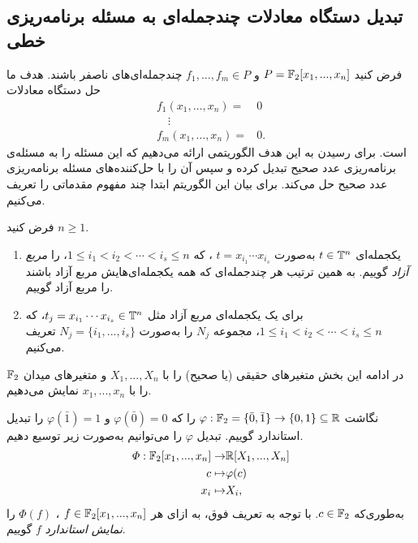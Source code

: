 \subsection{تبدیل دستگاه معادلات چندجمله‌ای به مسئله برنامه‌ریزی خطی}
فرض کنید 
$P = \mathbb{F}_{2}[x_{1},...,x_{n}]$
و 
$f_{1},...,f_{m}\in P$
چندجمله‌ای‌های ناصفر باشند.  هدف ما حل دستگاه معادلات 
\begin{align*}
f_{1}(x_{1}, \ldots, x_{n}) =& 0\\
\quad \vdots& \\
f_{m}(x_{1}, \ldots, x_{n}) =& 0. 
\end{align*}
است. برای رسیدن به این هدف الگوریتمی ارائه می‌دهیم که این مسئله را به مسئله‌ی برنامه‌ریزی عدد صحیح تبدیل کرده و سپس آن را با حل‌کننده‌های  مسئله‌  برنامه‌ریزی عدد صحیح حل می‌کند.  برای بیان این الگوریتم ابتدا چند مفهوم مقدماتی را تعریف می‌کنیم. 
\begin{definition}
فرض کنید
$n \geq 1$.
\begin{enumerate}
\item 
یکجمله‌ای‌ 
$t\in {\mathbb{T}}^{n}$
به‌صورت 
$t = x_{i_{1}}\cdots x_{i_{s}}$
،  که 
$1\leq i_{1}< i_{2} < \cdots < i_{s} \leq n$،
را 
\textit{مربع آزاد}
گوییم. به همین ترتیب هر چندجمله‌ای که همه‌  یکجمله‌ای‌هایش مربع آزاد باشند را مربع آزاد گوییم. 
\item
برای یک یکجمله‌ای مربع آزاد مثل 
$t_{j} = x_{i_{1}}\cdots x_{i_{s}}\in {\mathbb{T}}^{n}$، 
که 
$1\leq i_{1} < i_{2} <\cdots < i_{s}\leq n$، 
مجموعه‌ 
$N_{j}$
را به‌صورت 
$N_{j} = \{i_{1},...,i_{s}\}$
تعریف می‌کنیم.
\end{enumerate}
\end{definition}
 در ادامه  این بخش متغیرهای حقیقی (یا صحیح) را با 
 $X_{1},...,X_{n}$
 و متغیرهای میدان 
 $\mathbb{F}_{2}$
 را با 
 $x_{1},...,x_{n}$
نمایش می‌دهیم. 
\begin{definition}
نگاشت 
$\varphi :\mathbb{F}_{2} = \{\bar{0},\bar{1}\}\rightarrow \{0, 1\}\subseteq \mathbb{R}$
را که 
$\varphi(\bar{0}) = 0$
و
$\varphi(\bar{1}) = 1$
را تبدیل استاندارد گوییم. تبدیل 
$\varphi$
را می‌توانیم به‌صورت زیر  توسیع دهیم. 
\begin{align*}
\varPhi:\mathbb{F}_{2}[x_{1},...,x_{n}]\rightarrow& \mathbb{R}[X_{1},...,X_{n}]\\
c\mapsto& \varphi(c)\\
x_{i}\mapsto& X_{i}, 
\end{align*}
به‌طوری‌که 
$c\in\mathbb{F}_{2}$. 
با توجه به تعریف فوق، به ازای هر 
$f\in \mathbb{F}_{2}[x_{1},...,x_{n}]$
، 
$\varPhi(f)$
را 
\textit{نمایش استاندارد}
$f$
گوییم. 
\end{definition}

